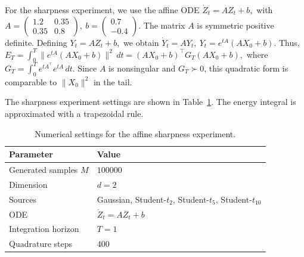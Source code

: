\documentclass[a4paper,11pt]{article}
\theoremstyle{plain}
\theoremstyle{definition}
\begin{document}
For the sharpness experiment, we use the affine ODE
\(
    \dot Z_t=AZ_t+b,
\)
with
\(
    A=
    \begin{pmatrix}
    1.2 & 0.35\\
    0.35 & 0.8
    \end{pmatrix},
    \ 
    b=
    \begin{pmatrix}
    0.7\\
    -0.4
    \end{pmatrix}.
\)
The matrix \(A\) is symmetric positive definite. Defining
\(
    Y_t=AZ_t+b,
\)
we obtain
\(
    \dot Y_t=AY_t,
    \ 
    Y_t=e^{tA}(AX_0+b).
\)
Thus,
\(
    E_T
    =
    \int_0^T
    \|e^{tA}(AX_0+b)\|^2\,dt
    =
    (AX_0+b)^\top G_T(AX_0+b),
\)
where
\(
    G_T=
    \int_0^T e^{tA^\top}e^{tA}\,dt.
\)
Since \(A\) is nonsingular and \(G_T\succ0\), this quadratic form is comparable to
\(\|X_0\|^2\) in the tail.

The sharpness experiment settings are shown in Table~\ref{tab:sharpness_numerics_settings}.
The energy integral is approximated with a trapezoidal rule.


\begin{table}[!h]
\centering
\small 
\begin{tabular}{ll}
\toprule
Parameter & Value \\
\midrule
Generated samples \(M\) & \(100000\) \\
Dimension & \(d=2\) \\
Sources & Gaussian, Student-\(t_2\), Student-\(t_5\), Student-\(t_{10}\) \\
ODE & \(\dot Z_t=AZ_t+b\) \\
Integration horizon & \(T=1\) \\
Quadrature steps & \(400\) \\
\bottomrule
\end{tabular}
\caption{Numerical settings for the affine sharpness experiment.}
\label{tab:sharpness_numerics_settings}
\end{table}
\end{document}
